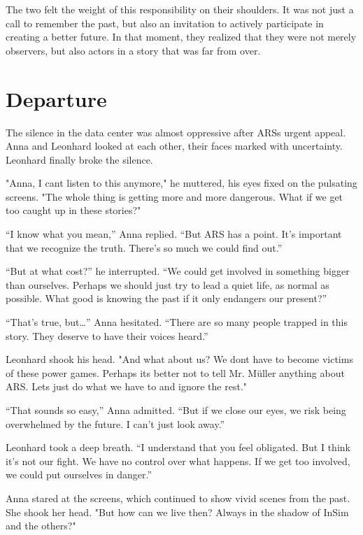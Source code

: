 \documentclass[
]{article}
\begin{document}
The two felt the weight of this responsibility on their shoulders. It was not just a call to remember the past, but also an invitation to actively participate in creating a better future. In that moment, they realized that they were not merely observers, but also actors in a story that was far from over.

\section{Departure}\label{departure}

The silence in the data center was almost oppressive after ARS\textquotesingle s urgent appeal. Anna and Leonhard looked at each other, their faces marked with uncertainty. Leonhard finally broke the silence.

"Anna, I can\textquotesingle t listen to this anymore," he muttered, his eyes fixed on the pulsating screens. "The whole thing is getting more and more dangerous. What if we get too caught up in these stories?"

``I know what you mean,'' Anna replied. ``But ARS has a point. It's important that we recognize the truth. There's so much we could find out.''

``But at what cost?'' he interrupted. ``We could get involved in something bigger than ourselves. Perhaps we should just try to lead a quiet life, as normal as possible. What good is knowing the past if it only endangers our present?''

``That's true, but\ldots'' Anna hesitated. ``There are so many people trapped in this story. They deserve to have their voices heard.''

Leonhard shook his head. "And what about us? We don\textquotesingle t have to become victims of these power games. Perhaps it\textquotesingle s better not to tell Mr. Müller anything about ARS. Let\textquotesingle s just do what we have to and ignore the rest."

``That sounds so easy,'' Anna admitted. ``But if we close our eyes, we risk being overwhelmed by the future. I can't just look away.''

Leonhard took a deep breath. ``I understand that you feel obligated. But I think it's not our fight. We have no control over what happens. If we get too involved, we could put ourselves in danger.''

Anna stared at the screens, which continued to show vivid scenes from the past. She shook her head. "But how can we live then? Always in the shadow of InSim and the others?"
\end{document}
